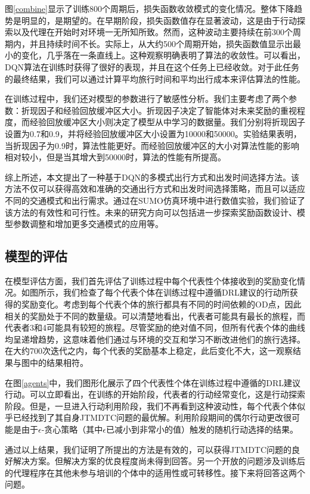 图\ref{combine}显示了训练800个周期后，损失函数收敛模式的变化情况。整体下降趋势是明显的，是期望的。在早期阶段，损失函数值存在显著波动，这是由于行动探索以及代理在开始时对环境一无所知所致。然而，这种波动主要持续在前300个周期内，并且持续时间不长。实际上，从大约500个周期开始，损失函数值显示出最小的变化，几乎落在一条直线上。这种观察明确表明了算法的收敛性。可以看出，DQN算法在训练时获得了很好的表现，并且在这个任务上已经收敛。对于此任务的最终结果，我们可以通过计算平均旅行时间和平均出行成本来评估算法的性能。

在训练过程中，我们还对模型的参数进行了敏感性分析。我们主要考虑了两个参数：折现因子和经验回放缓冲区大小。折现因子决定了智能体对未来奖励的重视程度，而经验回放缓冲区大小则决定了模型从中学习的数据量。我们分别将折现因子设置为0.7和0.9，并将经验回放缓冲区大小设置为10000和50000。实验结果表明，当折现因子为0.9时，算法性能更好。而经验回放缓冲区的大小对算法性能的影响相对较小，但是当其增大到50000时，算法的性能有所提高。

综上所述，本文提出了一种基于DQN的多模式出行方式和出发时间选择方法。该方法不仅可以获得高效和准确的交通出行方式和出发时间选择策略，而且可以适应不同的交通模式和出行需求。通过在SUMO仿真环境中进行数值实验，我们验证了该方法的有效性和可行性。未来的研究方向可以包括进一步探索奖励函数设计、模型参数调整和增加更多交通模式的应用等。
\subsection{模型的评估}

在模型评估方面，我们首先评估了训练过程中每个代表性个体接收到的奖励变化情况。如图所示，我们检查了每个代表个体在训练过程中遵循DRL建议的行动所获得的奖励变化。考虑到每个代表个体的旅行都具有不同的时间依赖的OD点，因此相关的奖励处于不同的数量级。可以清楚地看出，代表者可能具有最长的旅程，而代表者3和4可能具有较短的旅程。尽管奖励的绝对值不同，但所有代表个体的曲线均呈递增趋势，这意味着他们通过与环境的交互和学习不断改进他们的旅行选择。在大约700次迭代之内，每个代表的奖励基本上稳定，此后变化不大，这一观察结果与图中的结果相符。

在图\ref{agents}中，我们图形化展示了四个代表性个体在训练过程中遵循的DRL建议行动。可以立即看出，在训练的开始阶段，代表者的行动经常变化，这是行动探索阶段。但是，一旦进入行动利用阶段，我们不再看到这种波动性，每个代表个体似乎已经找到了其自身JTMDTC问题的最优解。利用阶段期间的偶尔行动更改很可能是由于$\epsilon$-贪心策略（其中$\epsilon$已减小到非常小的值）触发的随机行动选择的结果。

通过以上结果，我们证明了所提出的方法是有效的，可以获得JTMDTC问题的良好解决方案。但解决方案的优良程度尚未得到回答。另一个开放的问题涉及训练后的代理程序在其他未参与培训的个体中的适用性或可转移性。接下来将回答这两个问题。

